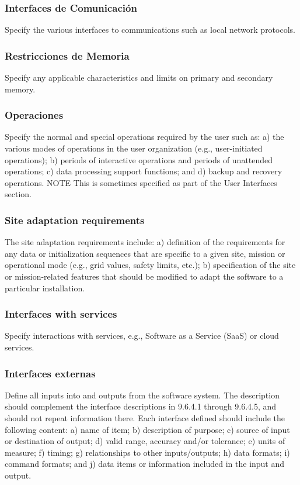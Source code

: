 \documentclass[12pt, a4paper, twoside]{article}
\begin{document}
 \subsubsection{Interfaces de Comunicación}
 Specify the various interfaces to communications such as local network protocols.

 \subsubsection{Restricciones de Memoria}
 Specify any applicable characteristics and limits on primary and secondary memory.

 \subsubsection{Operaciones}
 Specify the normal and special operations required by the user such as:
 a) the various modes of operations in the user organization (e.g., user-initiated operations);
 b) periods of interactive operations and periods of unattended operations;
 c) data processing support functions; and
 d) backup and recovery operations.
 NOTE This is sometimes specified as part of the User Interfaces section.

 \subsubsection{Site adaptation requirements}
 The site adaptation requirements include:
 a) definition of the requirements for any data or initialization sequences that are specific to a given
 site, mission or operational mode (e.g., grid values, safety limits, etc.);
 b) specification of the site or mission-related features that should be modified to adapt the software
 to a particular installation.

 \subsubsection{Interfaces with services}
 Specify interactions with services, e.g., Software as a Service (SaaS) or cloud services.

 \subsubsection{Interfaces externas}
 Define all inputs into and outputs from the software system. The description should complement the
 interface descriptions in 9.6.4.1 through 9.6.4.5, and should not repeat information there.
 Each interface defined should include the following content:
 a) name of item;
 b) description of purpose;
 c) source of input or destination of output;
 d) valid range, accuracy and/or tolerance;
 e) units of measure;
 f) timing;
 g) relationships to other inputs/outputs;
 h) data formats;
 i) command formats; and
 j) data items or information included in the input and output.
\end{document}
